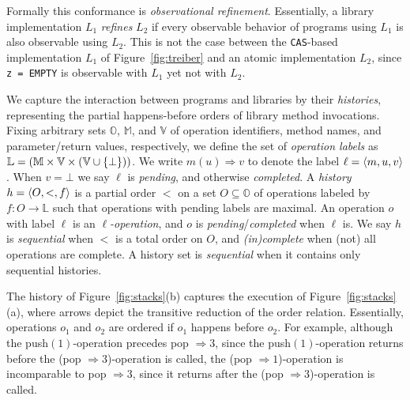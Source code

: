 Formally this conformance is \emph{observational refinement}. Essentially, a
library implementation $L_1$ \emph{refines} $L_2$ if every observable behavior
of programs using $L_1$ is also observable using $L_2$. This is not the case
between the {\tt CAS}-based implementation $L_1$ of Figure~\ref{fig:treiber}
and an atomic implementation $L_2$, since {\tt z = EMPTY} is observable with
$L_1$ yet not with $L_2$.

We capture the interaction between programs and libraries by their
\emph{histories}, representing the partial happens-before orders of library
method invocations. Fixing arbitrary sets $\mathbb{O}$, $\mathbb{M}$, and
$\mathbb{V}$ of operation identifiers, method names, and parameter/return
values, respectively, we define the set of \emph{operation labels} as
$\mathbb{L} = (\mathbb{M} \times \mathbb{V} \times (\mathbb{V} \cup
{\{ \bot \}}))$. We write $m(u) \Rightarrow v$ to denote the label $\ell =
{\langle{m,u,v}\rangle}$. When $v = \bot$ we say $\ell$ is \emph{pending}, and otherwise
\emph{completed}. A \emph{history} $h = {\langle{O,<,f}\rangle}$ is a partial order $<$ on
a set $O \subseteq \mathbb{O}$ of operations labeled by $f : O \to \mathbb{L}$
such that operations with pending labels are maximal. An operation $o$ with
label $\ell$ is an \emph{$\ell$-operation}, and $o$ is
\emph{pending}/\emph{completed} when $\ell$ is. We say $h$ is \emph{sequential}
when $<$ is a total order on $O$, and \emph{(in)complete} when (not) all
operations are complete. A history set is \emph{sequential} when it contains
only sequential histories.

\begin{example}

  The history of Figure~\ref{fig:stacks}(b) captures the execution of
  Figure~\ref{fig:stacks}(a), where arrows depict the transitive reduction of
  the order relation. Essentially, operations $o_1$ and $o_2$ are ordered if
  $o_1$ happens before $o_2$. For example, although the push$(1)$-operation
  precedes pop $\Rightarrow 3$, since the push$(1)$-operation returns before
  the (pop $\Rightarrow 3$)-operation is called, the (pop $\Rightarrow
  1$)-operation is incomparable to pop $\Rightarrow 3$, since it returns
  after the (pop $\Rightarrow 3$)-operation is called.

\end{example}

